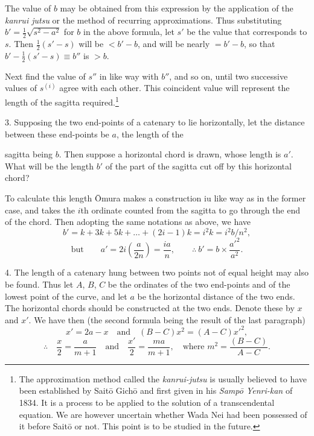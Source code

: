 \documentclass[11pt]{article}
\newcommand{\scanpage}[2]{\clearpage\setcounter{footnote}{0}\noindent{\footnotesize\color{gray}PDF page #1 · #2}\par\medskip}
\begin{document}
The value of $b$ may be obtained from this expression by the application of the \emph{kanrui jutsu} or the method of recurring approximations. Thus substituting $b' = \frac{1}{2}\sqrt{s^2 - a^2}$ for $b$ in the above formula, let $s'$ be the value that corresponds to $s$. Then $\frac{1}{2}(s' - s)$ will be $< b' - b$, and will be nearly $= b' - b$, so that $b' - \frac{1}{2}(s' - s) \equiv b''$ is $> b$.

Next find the value of $s''$ in like way with $b''$, and so on, until two successive values of $s^{(i)}$ agree with each other. This coincident value will represent the length of the sagitta required.\footnote{The approximation method called the \emph{kanrui-jutsu} is usually believed to have been established by Saitō Gichō and first given in his \emph{Sampō Yenri-kan} of 1834. It is a process to be applied to the solution of a transcendental equation. We are however uncertain whether Wada Nei had been possessed of it before Saitō or not. This point is to be studied in the future.}

3. Supposing the two end-points of a catenary to lie horizontally, let the distance between these end-points be $a$, the length of the

\scanpage{0310}{printed page 296}
sagitta being $b$. Then suppose a horizontal chord is drawn, whose length is $a'$. What will be the length $b'$ of the part of the sagitta cut off by this horizontal chord?

To calculate this length Ōmura makes a construction iu like way as in the former case, and takes the $i$th ordinate counted from the sagitta to go through the end of the chord. Then adopting the same notations as above, we have
\[
b' = k + 3k + 5k + \ldots + (2i-1)k = i^2k = i^2b/n^2,
\]
\[
\text{but}\qquad a' = 2i\left(\frac{a}{2n}\right) = \frac{ia}{n}, \qquad \therefore\ b' = b \times \frac{a'^2}{a^2}.
\]

4. The length of a catenary hung between two points not of equal height may also be found. Thus let $A$, $B$, $C$ be the ordinates of the two end-points and of the lowest point of the curve, and let $a$ be the horizontal distance of the two ends. The horizontal chords should be constructed at the two ends. Denote these by $x$ and $x'$. We have then (the second formula being the result of the last paragraph)
\[
x' = 2a - x \quad\text{and}\quad (B-C)x^2 = (A-C)x'^2,
\]
\[
\therefore\quad \frac{x}{2} = \frac{a}{m+1} \quad\text{and}\quad \frac{x'}{2} = \frac{ma}{m+1}, \quad\text{where } m^2 = \frac{(B-C)}{A-C}.
\]
\end{document}

